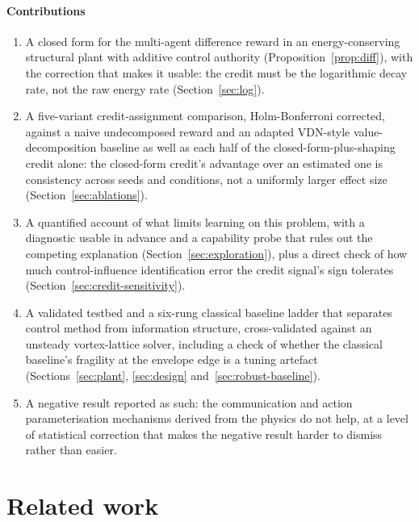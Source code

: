 \documentclass[journal]{new-aiaa}
\begin{document}
\paragraph{Contributions}
\begin{enumerate}
\item A closed form for the multi-agent difference reward in an
energy-conserving structural plant with additive control authority
(Proposition~\ref{prop:diff}), with the correction that makes it usable: the
credit must be the logarithmic decay rate, not the raw energy rate
(Section~\ref{sec:log}).
\item A five-variant credit-assignment comparison, Holm-Bonferroni corrected,
against a naive undecomposed reward and an adapted VDN-style
value-decomposition baseline as well as each half of the
closed-form-plus-shaping credit alone: the closed-form credit's advantage
over an estimated one is consistency across seeds and conditions, not a
uniformly larger effect size (Section~\ref{sec:ablations}).
\item A quantified account of what limits learning on this problem, with a
diagnostic usable in advance and a capability probe that rules out the
competing explanation (Section~\ref{sec:exploration}), plus a direct check of
how much control-influence identification error the credit signal's sign
tolerates (Section~\ref{sec:credit-sensitivity}).
\item A validated testbed and a six-rung classical baseline ladder that
separates control method from information structure, cross-validated
against an unsteady vortex-lattice solver, including a check of whether the
classical baseline's fragility at the envelope edge is a tuning artefact
(Sections~\ref{sec:plant}, \ref{sec:design} and~\ref{sec:robust-baseline}).
\item A negative result reported as such: the communication and action
parameterisation mechanisms derived from the physics do not help, at a
level of statistical correction that makes the negative result harder to
dismiss rather than easier.
\end{enumerate}

\section{Related work}
\label{sec:related}
\end{document}
